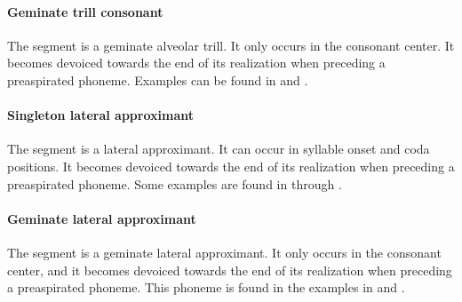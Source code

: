 \paragraph{Geminate trill consonant}
The segment  is a geminate alveolar trill. It only occurs in the consonant center. 
It becomes devoiced \ipa{[rr̥ː]} towards the end of its realization when preceding a preaspirated phoneme. 
Examples can be found in  and . 

\paragraph{Singleton lateral approximant}
The segment  is a lateral approximant. It can occur in syllable onset and coda positions. 
It becomes devoiced \ipa{[ll̥]} towards the end of its realization when preceding a preaspirated phoneme. 
Some examples are found in  through . 

\paragraph{Geminate lateral approximant}
The segment  is a geminate lateral approximant. It only occurs in the consonant center, and it becomes devoiced \ipa{[ll̥ː]} towards the end of its realization when preceding a preaspirated phoneme. 
This phoneme is found in the examples in  and .


